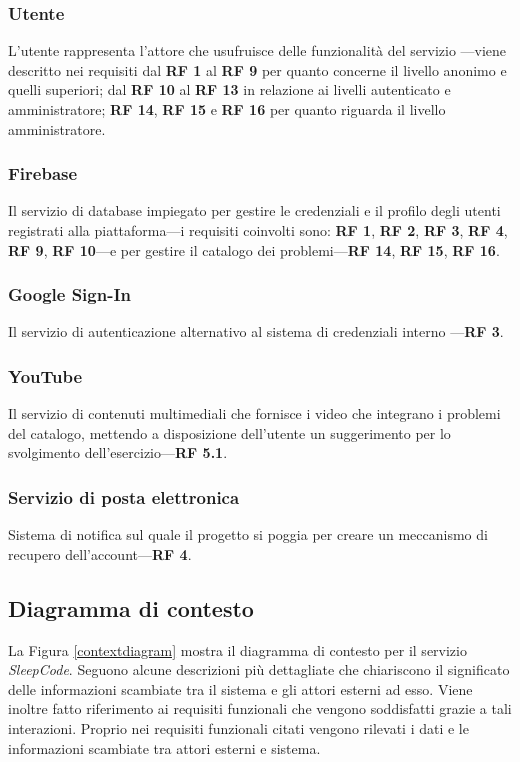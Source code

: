 \documentclass[11pt, a4paper]{article}
\theoremstyle{definition} %
\begin{document}
\subsubsection{Utente}
L'utente rappresenta l'attore che usufruisce delle funzionalità del servizio
—viene descritto nei requisiti dal \textbf{RF 1} al \textbf{RF 9} per quanto
concerne il livello anonimo e quelli superiori; dal \textbf{RF 10} al
\textbf{RF 13} in relazione ai livelli autenticato e amministratore; \textbf{RF 14},
\textbf{RF 15} e \textbf{RF 16} per quanto riguarda il livello amministratore.

\subsubsection{Firebase}
Il servizio di database impiegato per gestire le credenziali e il profilo
degli utenti registrati alla piattaforma—i requisiti coinvolti sono: \textbf{RF 1},
\textbf{RF 2}, \textbf{RF 3}, \textbf{RF 4}, \textbf{RF 9}, \textbf{RF 10}—e per gestire il
catalogo dei problemi—\textbf{RF 14}, \textbf{RF 15}, \textbf{RF 16}.

\subsubsection{Google Sign-In}
Il servizio di autenticazione alternativo al sistema di credenziali interno
—\textbf{RF 3}.

\subsubsection{YouTube}
Il servizio di contenuti multimediali che fornisce i video che integrano
i problemi del catalogo, mettendo a disposizione dell'utente un suggerimento per lo
svolgimento dell'esercizio—\textbf{RF 5.1}.

\subsubsection{Servizio di posta elettronica}
Sistema di notifica sul quale il progetto si poggia per creare un
meccanismo di recupero dell'account—\textbf{RF 4}.

\newpage
\subsection{Diagramma di contesto} %
La Figura \ref{contextdiagram} mostra il diagramma di contesto per il
servizio \textit{SleepCode}. Seguono alcune descrizioni più dettagliate
che chiariscono il significato delle informazioni scambiate tra il sistema
e gli attori esterni ad esso. Viene inoltre fatto riferimento ai requisiti
funzionali che vengono soddisfatti grazie a tali interazioni. Proprio nei
requisiti funzionali citati vengono rilevati i dati e le informazioni
scambiate tra attori esterni e sistema.
\end{document}
